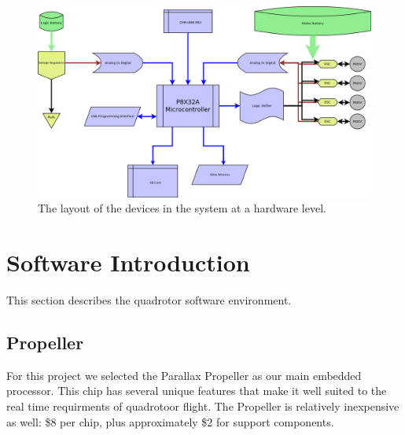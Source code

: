 \documentclass{article}
\numberwithin{equation}{section} %
\begin{document}
\begin{figure}[h!]
  \centering
	\includegraphics[scale=.22]{system_architecture.png}
  \caption{The layout of the devices in the system at a hardware level.}
\end{figure}  




\section{Software Introduction}
This section describes the quadrotor software environment.
\subsection{Propeller}
For this project we selected the Parallax Propeller as our main embedded processor. This chip has several unique features that make it well suited to the real time requirments of quadrotoor flight. The Propeller is relatively inexpensive as well: \$8 per chip, plus approximately \$2 for support components.
\end{document}
